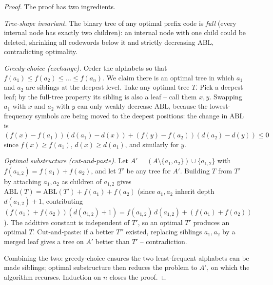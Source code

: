 \begin{proof}
\sketchproof
The proof has two ingredients.

\medskip
\noindent\textit{Tree-shape invariant.} The binary tree of any optimal prefix code is \emph{full} (every internal node has exactly two children): an internal node with one child could be deleted, shrinking all codewords below it and strictly decreasing $\mathrm{ABL}$, contradicting optimality.

\medskip
\noindent\textit{Greedy-choice (exchange).} Order the alphabets so that $f(a_1) \le f(a_2) \le \dots \le f(a_n)$. We claim there is an optimal tree in which $a_1$ and $a_2$ are siblings at the deepest level. Take any optimal tree $T$. Pick a deepest leaf; by the full-tree property its sibling is also a leaf -- call them $x, y$. Swapping $a_1$ with $x$ and $a_2$ with $y$ can only weakly decrease $\mathrm{ABL}$, because the lowest-frequency symbols are being moved to the deepest positions: the change in $\mathrm{ABL}$ is $(f(x)-f(a_1))(d(a_1)-d(x)) + (f(y)-f(a_2))(d(a_2)-d(y)) \le 0$ since $f(x) \ge f(a_1)$, $d(x) \ge d(a_1)$, and similarly for $y$.

\medskip
\noindent\textit{Optimal substructure (cut-and-paste).} Let $A' = (A \setminus \{a_1,a_2\}) \cup \{a_{1,2}\}$ with $f(a_{1,2}) = f(a_1)+f(a_2)$, and let $T'$ be any tree for $A'$. Building $T$ from $T'$ by attaching $a_1, a_2$ as children of $a_{1,2}$ gives $\mathrm{ABL}(T) = \mathrm{ABL}(T') + f(a_1)+f(a_2)$ (since $a_1, a_2$ inherit depth $d(a_{1,2})+1$, contributing $(f(a_1)+f(a_2))(d(a_{1,2})+1) = f(a_{1,2})\,d(a_{1,2}) + (f(a_1)+f(a_2))$). The additive constant is independent of $T'$, so an optimal $T'$ produces an optimal $T$. Cut-and-paste: if a better $T''$ existed, replacing siblings $a_1, a_2$ by a merged leaf gives a tree on $A'$ better than $T'$ -- contradiction.

\medskip
Combining the two: greedy-choice ensures the two least-frequent alphabets can be made siblings; optimal substructure then reduces the problem to $A'$, on which the algorithm recurses. Induction on $n$ closes the proof.
\end{proof}

